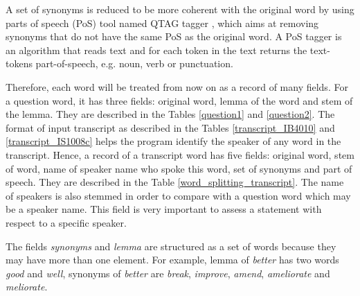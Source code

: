 A set of synonyms is reduced to be more coherent with the original word by using parts of speech (PoS) tool named QTAG tagger \cite{manson1997qpp}, which aims at removing synonyms that do not have the same PoS as the original word. A PoS tagger is an algorithm that reads text and for each token in the text returns the text-tokens part-of-speech, e.g. noun, verb or punctuation. 

Therefore, each word will be treated from now on as a record of many fields. For a question word, it has three fields: original word, lemma of the word and stem of the lemma. They are described in the Tables \ref{question1} and \ref{question2}. The format of input transcript as described in the Tables \ref{transcript_IB4010} and \ref{transcript_IS1008c} helps the program identify the speaker of any word in the transcript. Hence, a record of a transcript word has five fields: original word, stem of word, name of speaker name who spoke this word, set of synonyms and part of speech. They are described in the Table \ref{word_splitting_transcript}. The name of speakers is also stemmed in order to compare with a question word which may be a speaker name. This field is very important to assess a statement with respect to a specific speaker.

The fields \textit{synonyms} and \textit{lemma} are structured as a set of words because they may have more than one element. For example, lemma of \textit{better} has two words \textit{good} and \textit{well}, synonyms of \textit{better} are \textit{break}, \textit{improve}, \textit{amend}, \textit{ameliorate} and \textit{meliorate}.


